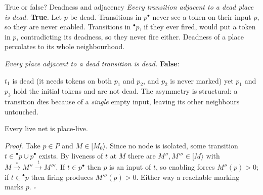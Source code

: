 \begin{examplebox}{True or false? Deadness and adjacency}
\emph{Every transition adjacent to a dead place is dead.} \textbf{True}. Let $p$ be dead. Transitions in $p^\bullet$ never see a token on their input $p$, so they are never enabled. Transitions in ${}^\bullet p$, if they ever fired, would put a token in $p$, contradicting its deadness, so they never fire either. Deadness of a place percolates to its whole neighbourhood.
\par\smallskip
\emph{Every place adjacent to a dead transition is dead.} \textbf{False}:
\begin{center}
\end{center}
$t_1$ is dead (it needs tokens on both $p_1$ and $p_2$, and $p_2$ is never marked) yet $p_1$ and $p_3$ hold the initial tokens and are not dead. The asymmetry is structural: a transition dies because of a \emph{single} empty input, leaving its other neighbours untouched.
\end{examplebox}

\begin{proposition}
Every live net is place-live.
\end{proposition}

\textit{Proof.} Take $p \in P$ and $M \in [M_0\rangle$. Since no node is isolated, some transition $t \in {}^\bullet p \cup p^\bullet$ exists. By liveness of $t$ at $M$ there are $M'', M''' \in [M\rangle$ with $M \xrightarrow{\star} M'' \xrightarrow{t} M'''$. If $t \in p^\bullet$ then $p$ is an input of $t$, so enabling forces $M''(p) > 0$; if $t \in {}^\bullet p$ then firing produces $M'''(p) > 0$. Either way a reachable marking marks $p$. \hfill$\square$

